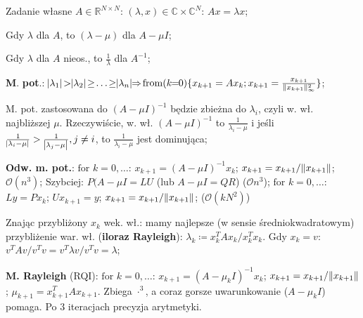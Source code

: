 
\entry
Zadanie własne $A \in \mathbb{R}^{N \times N}$:
$(\lambda,x) \in \mathbb{C} \times \mathbb{C}^N$:
$Ax = \lambda x$;

\entry
Gdy $\lambda$ dla $A$, to $(\lambda - \mu)$ dla $A-\mu I$;

\entry
Gdy $\lambda$ dla $A$ nieos., to $\frac{1}{\lambda}$ dla $A^{-1}$;

\entry
\textbf{M}. \textbf{pot}.:
$\abs{\lambda_1} \!>\! \abs{\lambda_2} \!\geq\! \ldots \!\geq\! \abs{\lambda_n}
\!\!\Rightarrow\!
\fromloop{k}\{x_{k+1}=Ax_k; \normifyfrac[\infty][2]{x_{k+1}}\}$;

\entry
M. pot. zastosowana do
$(A-\mu I)^{-1}$
będzie zbieżna do
$\lambda_i$,
czyli w. wł. najbliższej $\mu$.
Rzeczywiście, w. wł.
$(A-\mu I)^{-1}$
to
$\frac{1}{\lambda_i-\mu}$
i jeśli
$\frac{1}{\abs{\lambda_i-\mu}} > \frac{1}{\abs{\lambda_j-\mu}}, j\neq i$,
to
$\frac{1}{\lambda_i-\mu}$
jest dominująca;

\entry
\textbf{Odw. m. pot.}:
$\text{for } k=0,\ldots$:
$x_{k+1} = (A-\mu I)^{-1}x_k$;
$x_{k+1} = x_{k+1} / \|x_{k+1}\|$;
$\mathcal{O}(n^3)$;
\entry
Szybciej:
$P(A- \mu I = LU$ (lub $A-\mu I = QR$) ($\mathcal{O}{n^3}$);
$\text{for } k=0,\ldots$:
$Ly=Px_k$;
$Ux_{k+1} = y$;
$x_{k+1} = x_{k+1} / \|x_{k+1}\|$;
($\mathcal{O}(kN^2)$)

\entry
Znając przybliżony $x_k$ wek. wł.: mamy najlepsze (w sensie
średniokwadratowym) przybliżenie war. wł. (\textbf{iloraz Rayleigh}):
$\lambda_k \coloneqq x_k^T A x_k / x_k^T x_k$.
Gdy $x_k = v$:
$v^T A v / v^T v = v^T \lambda v / v^T v = \lambda$;

\entry
\textbf{M. Rayleigh} (RQI):
$\text{for } k=0,\ldots$:
$x_{k+1} = (A - \mu_k I)^{-1} x_k$;
$x_{k+1} = x_{k+1} / \|x_{k+1}\|$;
$\mu_{k+1} = x_{k+1}^T A x_{k+1}$.
Zbiega $\cdot^3$, a coraz gorsze uwarunkowanie ($A-\mu_k I$) pomaga.
Po $3$ iteracjach precyzja arytmetyki.


